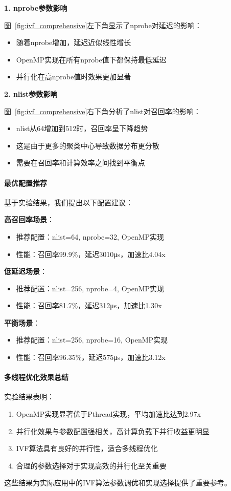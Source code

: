 \textbf{1. nprobe参数影响}

图~\ref{fig:ivf_comprehensive}左下角显示了nprobe对延迟的影响：
\begin{itemize}
    \item 随着nprobe增加，延迟近似线性增长
    \item OpenMP实现在所有nprobe值下都保持最低延迟
    \item 并行化在高nprobe值时效果更加显著
\end{itemize}

\textbf{2. nlist参数影响}

图~\ref{fig:ivf_comprehensive}右下角分析了nlist对召回率的影响：
\begin{itemize}
    \item nlist从64增加到512时，召回率呈下降趋势
    \item 这是由于更多的聚类中心导致数据分布更分散
    \item 需要在召回率和计算效率之间找到平衡点
\end{itemize}

\paragraph{最优配置推荐}

基于实验结果，我们提出以下配置建议：

\textbf{高召回率场景}：
\begin{itemize}
    \item 推荐配置：nlist=64, nprobe=32, OpenMP实现
    \item 性能：召回率99.9\%，延迟3010μs，加速比4.04x
\end{itemize}

\textbf{低延迟场景}：
\begin{itemize}
    \item 推荐配置：nlist=256, nprobe=4, OpenMP实现
    \item 性能：召回率81.7\%，延迟312μs，加速比1.30x
\end{itemize}

\textbf{平衡场景}：
\begin{itemize}
    \item 推荐配置：nlist=256, nprobe=16, OpenMP实现
    \item 性能：召回率96.35\%，延迟575μs，加速比3.12x
\end{itemize}

\paragraph{多线程优化效果总结}

实验结果表明：
\begin{enumerate}
    \item OpenMP实现显著优于Pthread实现，平均加速比达到2.97x
    \item 并行化效果与参数配置强相关，高计算负载下并行收益更明显
    \item IVF算法具有良好的并行性，适合多线程优化
    \item 合理的参数选择对于实现高效的并行化至关重要
\end{enumerate}

这些结果为实际应用中的IVF算法参数调优和实现选择提供了重要参考。 